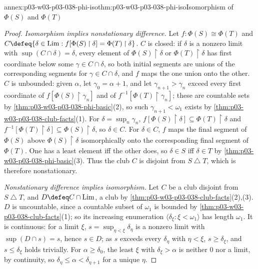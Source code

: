 \begin{annexitem}{annex:p03-w03-p03-038-phi-iso}{thm:p03-w03-p03-038-phi-iso}{Isomorphism of \(\Phi(S)\) and \(\Phi(T)\)}
\begin{proof}
\emph{Isomorphism implies nonstationary difference.} Let
\(f:\Phi(S)\cong\Phi(T)\) and
\(C\defeq\{\delta\in\mathrm{Lim}:f[\Phi(S)\mathbin{\upharpoonright}\delta]=
\Phi(T)\mathbin{\upharpoonright}\delta\}\). \(C\) is closed: if \(\delta\) is a
nonzero limit with \(\sup(C\cap\delta)=\delta\), every element of
\(\Phi(S)\mathbin{\upharpoonright}\delta\) or
\(\Phi(T)\mathbin{\upharpoonright}\delta\) has first coordinate below some
\(\gamma\in C\cap\delta\), so both initial segments are unions of the
corresponding segments for \(\gamma\in C\cap\delta\), and \(f\) maps the one
union onto the other. \(C\) is unbounded: given \(\alpha\), let
\(\gamma_0=\alpha+1\), and let \(\gamma_{n+1}>\gamma_n\) exceed every first
coordinate of \(f[\Phi(S)\mathbin{\upharpoonright}\gamma_n]\) and of
\(f^{-1}[\Phi(T)\mathbin{\upharpoonright}\gamma_n]\); these are countable sets
by \cref{thm:p03-w03-p03-038-phi-basic}(2), so such \(\gamma_{n+1}<\omega_1\)
exists by \cref{thm:p03-w03-p03-038-club-facts}(1). For
\(\delta=\sup_n\gamma_n\), \(f[\Phi(S)\mathbin{\upharpoonright}\delta]\subseteq
\Phi(T)\mathbin{\upharpoonright}\delta\) and
\(f^{-1}[\Phi(T)\mathbin{\upharpoonright}\delta]\subseteq
\Phi(S)\mathbin{\upharpoonright}\delta\), so \(\delta\in C\). For \(\delta\in C\),
\(f\) maps the final segment of \(\Phi(S)\) above
\(\Phi(S)\mathbin{\upharpoonright}\delta\) isomorphically onto the corresponding
final segment of \(\Phi(T)\). One has a least element iff the other does, so
\(\delta\in S\) iff \(\delta\in T\) by
\cref{thm:p03-w03-p03-038-phi-basic}(3). Thus the club \(C\) is disjoint
from \(S\mathbin{\triangle}T\), which is therefore nonstationary.

\emph{Nonstationary difference implies isomorphism.} Let \(C\) be a club
disjoint from \(S\mathbin{\triangle}T\), and \(D\defeq C\cap\mathrm{Lim}\), a
club by \cref{thm:p03-w03-p03-038-club-facts}(2),(3). \(D\) is uncountable,
since a countable subset of \(\omega_1\) is bounded by
\cref{thm:p03-w03-p03-038-club-facts}(1); so its increasing enumeration
\(\langle\delta_\xi:\xi<\omega_1\rangle\) has length \(\omega_1\). It is
continuous: for a limit \(\xi\), \(s=\sup_{\eta<\xi}\delta_\eta\) is a nonzero
limit with \(\sup(D\cap s)=s\), hence \(s\in D\); as \(s\) exceeds every
\(\delta_\eta\) with \(\eta<\xi\), \(s\ge\delta_\xi\), and \(s\le\delta_\xi\)
holds trivially. For \(\alpha\ge\delta_0\), the least \(\xi\) with
\(\delta_\xi>\alpha\) is neither \(0\) nor a limit, by continuity, so
\(\delta_\eta\le\alpha<\delta_{\eta+1}\) for a unique \(\eta\).


\end{proof}
\end{annexitem}
